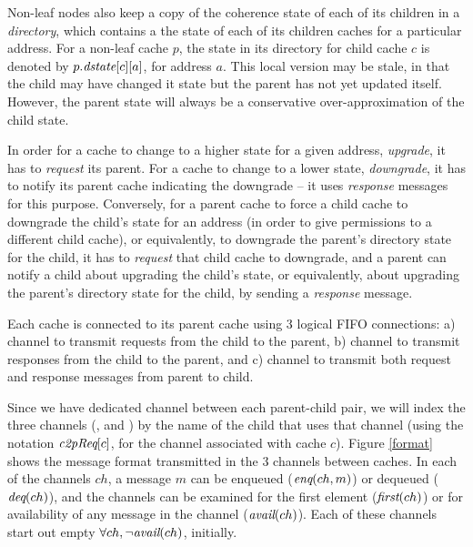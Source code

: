 Non-leaf nodes also keep a copy of the coherence state of each of its
children in a \emph{directory}, which contains a the state of each of
its children caches for a particular address. For a non-leaf cache
$p$, the state in its directory for child cache $c$ is denoted by
$p.\textit{dstate}[c][a]$, for address $a$. This local version may be stale,
in that the child may have changed it state but the parent has not yet
updated itself. However, the parent state will always be a
conservative over-approximation of the child state.

In order for a cache to change to a higher state for a given address,
\ie{} \emph{upgrade}, it has to \emph{request} its parent.  For a
cache to change to a lower state, \ie{} \emph{downgrade}, it has to
notify its parent cache indicating the downgrade -- it uses
\emph{response} messages for this purpose. Conversely, for a parent
cache to force a child cache to downgrade the child's state for an
address (in order to give permissions to a different child cache), or
equivalently, to downgrade the parent's directory state for the child,
it has to \emph{request} that child cache to downgrade, and a parent
can notify a child about upgrading the child's state, or equivalently,
about upgrading the parent's directory state for the child, by sending
a \emph{response} message.

Each cache is connected to its parent cache using 3 logical FIFO
connections: a) \cpReq{} channel to transmit requests from the child
to the parent, b) \cpResp{} channel to transmit responses from the
child to the parent, and c) \pc{} channel to transmit both request and
response messages from parent to child. 

Since we have dedicated channel between each parent-child pair, we
will index the three channels (\cpReq{}, \cpResp{} and \pc{}) by the
name of the child that uses that channel (using the notation
$\textit{c2pReq}[c]$, \etc for the \cpReq{} channel associated with cache $c$).
Figure \ref{format} shows the message format transmitted in the 3
channels between caches. In each of the channels $ch$, a message $m$
can be enqueued ($\textit{enq}(ch, m)$) or dequeued ($\textit{deq}(ch)$), and the
channels can be examined for the first element ($\textit{first}(ch)$) or for
availability of any message in the channel ($\textit{avail}(ch)$).  Each of
these channels start out empty \ie $\forall ch, \neg \textit{avail}(ch)$,
initially.

